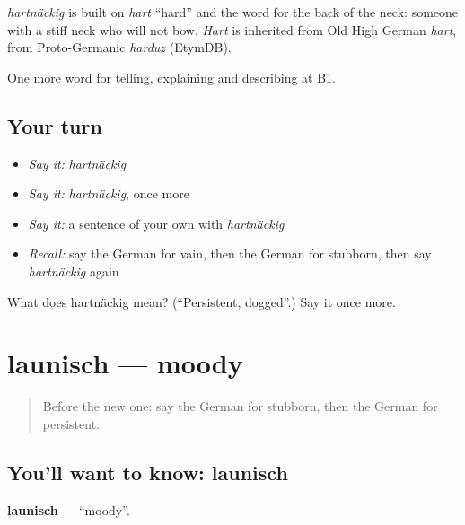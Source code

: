 \begin{cousinweb}
\emph{hartnäckig} is built on \emph{hart} \textquotedblleft{}hard\textquotedblright{} and the word for the back of the neck: someone with a stiff neck who will not bow. \emph{Hart} is inherited from Old High German \emph{hart}, from Proto-Germanic \emph{harduz} (EtymDB).
\end{cousinweb}

\begin{grammarlens}[title={What you've built}]
One more word for telling, explaining and describing at B1.
\end{grammarlens}

\subsection*{Your turn}
\begin{itemize}
\raggedright
  \item \emph{Say it:} \emph{hartnäckig}
  \item \emph{Say it:} \emph{hartnäckig}, once more
  \item \emph{Say it:} a sentence of your own with \emph{hartnäckig}
  \item \emph{Recall:} say the German for vain, then the German for stubborn, then say \emph{hartnäckig} again
\end{itemize}

\begin{tcolorbox}[breakable,colback=teal!4,colframe=teal!35!black,title={Before you move on}]
What does hartnäckig mean? (\textquotedblleft{}Persistent, dogged\textquotedblright{}.) Say it once more.
\end{tcolorbox}
\section[launisch]{launisch — moody}

\label{lesson:GE-C476-launisch}



\begin{quote}
Before the new one: say the German for stubborn, then the German for persistent.
\end{quote}

\subsection*{You'll want to know: launisch}
\textbf{launisch} — \textquotedblleft{}moody\textquotedblright{}.


